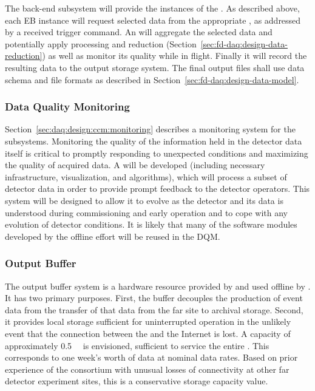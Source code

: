 The  back-end subsystem will provide the instances of the .
As described above, each EB instance will request selected data from
the appropriate , as addressed by a received trigger command. 
An  will aggregate the selected data and potentially apply processing and reduction (Section~\ref{sec:fd-daq:design-data-reduction}) as well as monitor its quality while in flight.
Finally it will record the resulting data to the output storage system.
The final output files shall use data schema and file formats as described in Section~\ref{sec:fd-daq:design-data-model}.



\subsubsection{Data Quality Monitoring}
\label{sec:fd-daq:design-data-quality}

Section~\ref{sec:daq:design:ccm:monitoring} describes a monitoring system for the  subsystems. 
Monitoring the quality of the information held in the detector data itself is critical to promptly responding to unexpected conditions and maximizing the quality of acquired data. 
A   
will be developed (including necessary infrastructure, visualization,
and algorithms), which will process a subset of detector data in order
to provide prompt feedback to the detector operators. 
This system will be designed to allow it to evolve as the detector and its data is understood during commissioning and early operation and to cope with any evolution of detector conditions.
It is likely that many of the software modules developed by the
offline effort will be reused in the DQM.

\subsubsection{Output Buffer}


The output buffer system is a hardware resource provided by  and used offline by . 
It has two primary purposes. 
First, the buffer decouples the production of event data from the transfer of that data from the far site to archival storage.
Second, it provides local storage sufficient for uninterrupted  operation in the unlikely event that the connection between the  and the Internet is lost. 
A capacity of approximately \SI{0.5}{\peta\byte} is envisioned,
sufficient to service the entire . This corresponds to one
week's worth of data at nominal data rates. Based on prior experience
of the consortium with unusual losses of 
connectivity at other far detector experiment sites, this is a
conservative storage capacity value.

